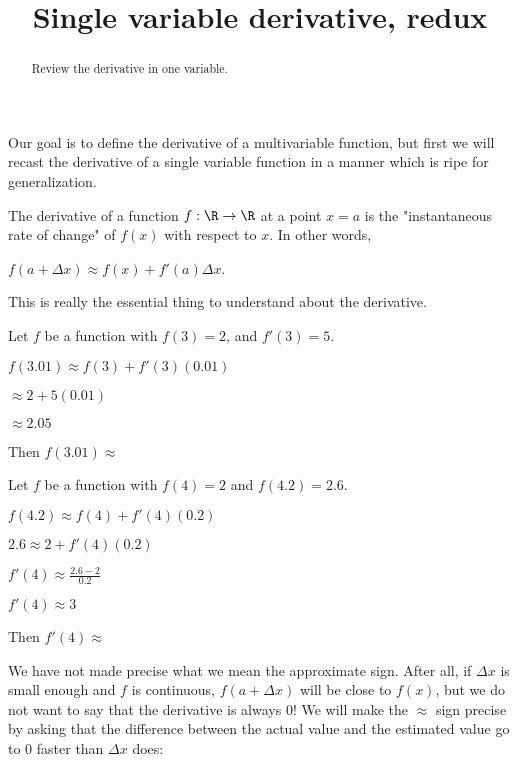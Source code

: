 \documentclass{ximera}
\title{Single variable derivative, redux}
\begin{document}
\begin{abstract}
Review the derivative in one variable.
\end{abstract}

	Our goal is to define the derivative of a multivariable function, but first we will recast the derivative of a single variable function in a
	manner which is ripe for generalization.
	
	The derivative of a function $f:\R \to \R$ at a point $x = a$ is the "instantaneous rate of change" of $f(x)$ with respect to $x$.
	In other words, 
	
	$f(a + \Delta x) \approx f(x) +f'(a)\Delta x$.
	
	This is really the essential thing to understand about the derivative.
	
	\begin{question}
		Let $f$ be a function with $f(3)  = 2$, and $f'(3) = 5$.
		\begin{solution}
			\begin{hint}
				$f(3.01) \approx f(3)+f'(3)(0.01)$
			\end{hint}
			\begin{hint}
				$\approx 2+5(0.01)$
			\end{hint}
			\begin{hint}
				$\approx 2.05$
			\end{hint}
			Then $f(3.01) \approx $ 
		\end{solution}
	\end{question}
	
	\begin{question}
		Let $f$ be a function with $f(4)=2$ and $f(4.2) = 2.6$.  
		
		\begin{solution}
			\begin{hint}
				$f(4.2) \approx f(4)+f'(4)(0.2)$
			\end{hint}
			\begin{hint}
				$2.6 \approx 2+f'(4)(0.2)$
			\end{hint}
			\begin{hint}
				$f'(4) \approx \frac{2.6 - 2}{0.2}$
			\end{hint}
			\begin{hint}
				$f'(4) \approx 3$
			\end{hint}
			Then $f'(4) \approx$ \answer{3}
		\end{solution}
	\end{question}
	
	We have not made precise what we mean the approximate sign.  After all, if $\Delta x$ is small enough and $f$ is continuous, 
	$f(a+\Delta x)$ will be close to $f(x)$, but we do not want to say that the derivative is always $0$!  We will make the  $\approx$ sign precise by asking that the difference 
	between the actual value and the estimated value go to $0$ faster than $\Delta x$ does:
	
\end{document}
